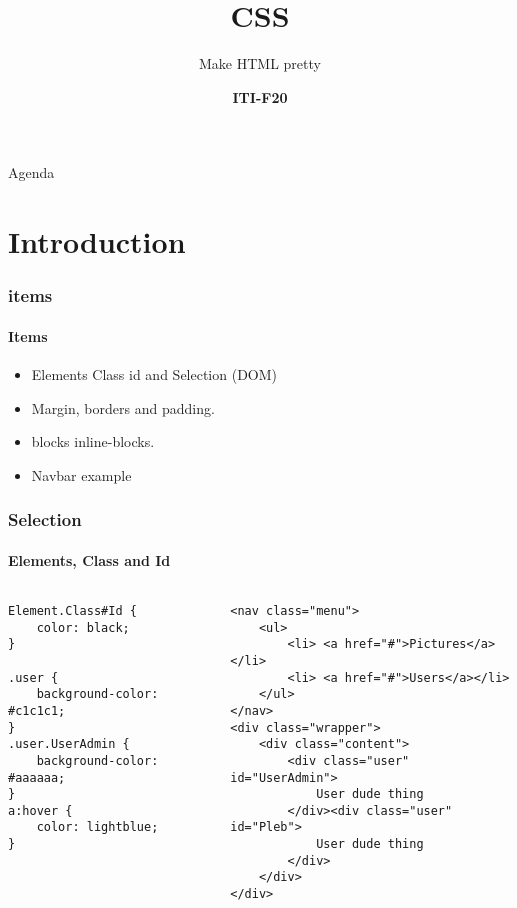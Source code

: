 \documentclass[aspectratio=169,10pt,t]{beamer}
\title{CSS}
\subtitle{Make HTML pretty}
\date{ }
\author{
  \textbf{ITI-F20}
}
\institute[
  SDU Robotics\\
  The Maersk Mc-Kinney Moller Institute\\
  University of Southern Denmark
] %
{%
  SDU Robotics\\
  The Maersk Mc-Kinney Moller Institute\\
  University of Southern Denmark

}
\begin{document}
{\SDUwavesbg%
\begin{frame} %
  \titlepage
\end{frame}}

\begin{frame}{Agenda}{\vphantom{(y}}
\tableofcontents
\end{frame}

\section{Introduction}


\begin{frame}[t]
	\frametitle{items}
	\framesubtitle{Items}


	\begin{itemize}
		\item Elements Class id and Selection (DOM)
		\item Margin, borders and padding.
		\item blocks inline-blocks.
		\item Navbar example
	\end{itemize}

\end{frame}

\begin{frame}[fragile]
	\frametitle{Selection}
	\framesubtitle{Elements, Class and Id}
	\vspace{-0.8cm}
	\begin{columns}
		\begin{column}{0.4\textwidth}
			\begin{verbatim}
Element.Class#Id {
	color: black;
}

.user {
	background-color: #c1c1c1;
}
.user.UserAdmin {
	background-color: #aaaaaa;
}
a:hover {
	color: lightblue;
}

			\end{verbatim}

		\end{column}
		\begin{column}{0.6\textwidth}
\begin{verbatim}
<nav class="menu">
	<ul>
		<li> <a href="#">Pictures</a></li>
		<li> <a href="#">Users</a></li>
	</ul>
</nav>
<div class="wrapper">
	<div class="content">
		<div class="user" id="UserAdmin">
			User dude thing
		</div><div class="user" id="Pleb">
			User dude thing
		</div>
	</div>
</div>
\end{verbatim}

		\end{column}
	\end{columns}


\end{frame}
\end{document}
